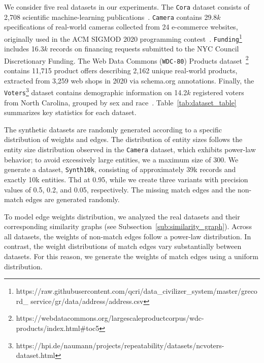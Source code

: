 \documentclass[sigconf, nonacm]{acmart}
\newcommand{\cora}{\texttt{Cora}\xspace}
\newcommand{\camera}{\texttt{Camera}\xspace}
\newcommand{\funding}{\texttt{Funding}\xspace}
\newcommand{\voters}{\texttt{Voters}\xspace}
\newcommand{\wdc}{\texttt{WDC-80}\xspace}
\newcommand{\synth}{\texttt{Synth10k}\xspace}
\begin{document}
We consider five real datasets in our experiments. The \cora dataset consists of 2,708 scientific machine-learning publications~\cite{firmani2016online}. \camera contains 29.8$k$ specifications of real-world cameras collected from 24 e-commerce websites, originally used in the ACM SIGMOD 2020 programming contest~\cite{crescenzi2021alaska}. \funding\footnote{https://raw.githubusercontent.com/qcri/data\_civilizer\_system/master/grecord\_
service/gr/data/address/address.csv} includes 16.3$k$ records on financing requests submitted to the NYC Council Discretionary Funding. The Web Data Commons (\wdc) Products dataset~\cite{peeters2023wdc}\footnote{https://webdatacommons.org/largescaleproductcorpus/wdc-products/index.html\#toc5} contains 11,715 product offers describing 2,162 unique real-world products, extracted from 3,259 web shops in 2020 via schema.org annotations. Finally, the \voters\footnote{https://hpi.de/naumann/projects/repeatability/datasets/ncvoters-dataset.html} dataset contains demographic information on 14.2$k$ registered voters from North Carolina, grouped by sex and race~\cite{voters_data}. Table~\ref{tab:dataset_table} summarizes key statistics for each dataset.


The synthetic datasets are randomly generated according to a specific distribution of weights and edges. The distribution of entity sizes follows the entity size distribution observed in the \camera dataset, which exhibits power-law behavior; to avoid excessively large entities, we a maximum size of 300. 
We generate a dataset, \synth, consisting of approximately 39k records and exactly 10k entities. Thd at 0.95, while we create three variants with precision values of 0.5, 0.2, and 0.05, respectively. The missing match edges and the non-match edges are generated randomly.
 

To model edge weights distribution, we analyzed the real datasets and their corresponding similarity graphs (see Subsection~\ref{sub:similarity_graph}). Across all datasets, the weights of non-match edges follow a power-law distribution. In contrast, the weight distributions of match edges vary substantially between datasets. For this reason, we generate the weights of match edges using a uniform distribution.
\end{document}
